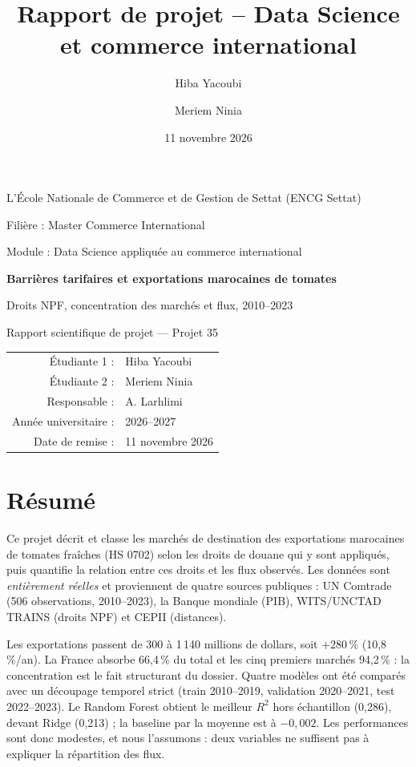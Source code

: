 \documentclass[11pt,a4paper]{article}
\title{\textbf{Rapport de projet -- Data Science et commerce international}}
\author{Hiba Yacoubi \and Meriem Ninia}
\date{11 novembre 2026}
\begin{document}
\begin{titlepage}
\centering
{\Large L'École Nationale de Commerce et de Gestion de Settat (ENCG Settat) \par}
\vspace{0.6cm}
{\large Filière : Master Commerce International\par}
\vspace{0.15cm}
{\large Module : Data Science appliquée au commerce international\par}
\vspace{1.6cm}
{\Huge\bfseries Barrières tarifaires et exportations marocaines de tomates\par}
\vspace{0.4cm}
{\LARGE Droits NPF, concentration des marchés et flux, 2010--2023\par}
\vspace{0.8cm}
{\large Rapport scientifique de projet — Projet 35\par}
\vspace{1.4cm}
\begin{tabular}{rl}
Étudiante 1 : & Hiba Yacoubi \\
Étudiante 2 : & Meriem Ninia \\
Responsable : & A. Larhlimi \\
Année universitaire : & 2026--2027 \\
Date de remise : & 11 novembre 2026 \\
\end{tabular}
\end{titlepage}

\section*{Résumé}

Ce projet décrit et classe les marchés de destination des exportations marocaines de
tomates fraîches (HS 0702) selon les droits de douane qui y sont appliqués, puis
quantifie la relation entre ces droits et les flux observés. Les données sont
\emph{entièrement réelles} et proviennent de quatre sources publiques : UN Comtrade
(506 observations, 2010--2023), la Banque mondiale (PIB), WITS/UNCTAD TRAINS (droits
NPF) et CEPII (distances).

Les exportations passent de 300 à 1\,140 millions de dollars, soit +280\,\%
(10,8\,\%/an). La France absorbe 66,4\,\% du total et les cinq premiers marchés
94,2\,\% : la concentration est le fait structurant du dossier. Quatre modèles ont été
comparés avec un découpage temporel strict (train 2010--2019, validation 2020--2021,
test 2022--2023). Le Random Forest obtient le meilleur $R^2$ hors échantillon
(0,286), devant Ridge (0,213) ; la baseline par la moyenne est à $-0{,}002$. Les
performances sont donc modestes, et nous l'assumons : deux variables ne suffisent pas à
expliquer la répartition des flux.
\end{document}
